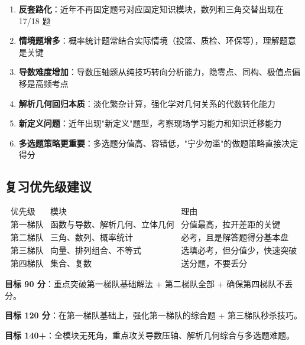 \begin{enumerate}
  \item \textbf{反套路化}：近年不再固定题号对应固定知识模块，数列和三角交替出现在 17/18 题
  \item \textbf{情境题增多}：概率统计题常结合实际情境（投篮、质检、环保等），理解题意是关键
  \item \textbf{导数难度增加}：导数压轴题从纯技巧转向分析能力，隐零点、同构、极值点偏移是高频考点
  \item \textbf{解析几何回归本质}：淡化繁杂计算，强化学对几何关系的代数转化能力
  \item \textbf{新定义问题}：近年出现"新定义"题型，考察现场学习能力和知识迁移能力
  \item \textbf{多选题策略更重要}：多选题分值高、容错低，"宁少勿滥"的做题策略直接决定得分
\end{enumerate}

\subsection{复习优先级建议}

\[
\begin{array}{c|c|c}
\text{优先级} & \text{模块} & \text{理由} \\ \hline
\textbf{第一梯队} & \text{函数与导数、解析几何、立体几何} & \text{分值最高，拉开差距的关键} \\
\textbf{第二梯队} & \text{三角、数列、概率统计} & \text{必考，且是解答题得分基本盘} \\
\textbf{第三梯队} & \text{向量、排列组合、不等式} & \text{选填必考，但分值少，快速突破} \\
\textbf{第四梯队} & \text{集合、复数} & \text{送分题，不要丢分}
\end{array}
\]

\textbf{目标 90 分}：重点突破第一梯队基础解法 + 第二梯队全部 + 确保第四梯队不丢分。

\textbf{目标 120 分}：在第一梯队基础上，强化第一梯队的综合题 + 第三梯队秒杀技巧。

\textbf{目标 140+}：全模块无死角，重点攻关导数压轴、解析几何综合与多选题难题。
